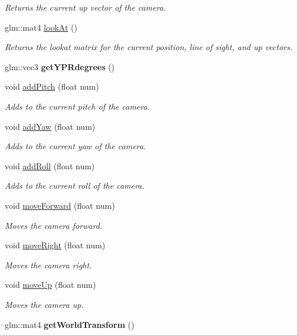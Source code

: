 \begin{DoxyCompactItemize}
\begin{DoxyCompactList}\small\item\em Returns the current up vector of the camera. \end{DoxyCompactList}\item 
glm\+::mat4 \hyperlink{class_y_p_r_camera_a6312430157dfe879afee0af5f7759a87}{look\+At} ()
\begin{DoxyCompactList}\small\item\em Returns the lookat matrix for the current position, line of sight, and up vectors. \end{DoxyCompactList}\item 
\mbox{\label{class_y_p_r_camera_aaac413817adc88cfc38a176bdc091abe}} 
glm\+::vec3 {\bfseries get\+Y\+P\+Rdegrees} ()
\item 
void \hyperlink{class_y_p_r_camera_ac301ce5ca1503a73cce5aa7a700c62e2}{add\+Pitch} (float num)
\begin{DoxyCompactList}\small\item\em Adds to the current pitch of the camera. \end{DoxyCompactList}\item 
void \hyperlink{class_y_p_r_camera_abca416bb77e38db7526e54e139153554}{add\+Yaw} (float num)
\begin{DoxyCompactList}\small\item\em Adds to the current yaw of the camera. \end{DoxyCompactList}\item 
void \hyperlink{class_y_p_r_camera_a40cd825b06e9d3b361bd3cf7c05d7b2a}{add\+Roll} (float num)
\begin{DoxyCompactList}\small\item\em Adds to the current roll of the camera. \end{DoxyCompactList}\item 
void \hyperlink{class_y_p_r_camera_a3fa6a8dba8cea84cabb9155b030d849e}{move\+Forward} (float num)
\begin{DoxyCompactList}\small\item\em Moves the camera forward. \end{DoxyCompactList}\item 
void \hyperlink{class_y_p_r_camera_a477ddad236b2b2d6cb2c8a7ae60cfa53}{move\+Right} (float num)
\begin{DoxyCompactList}\small\item\em Moves the camera right. \end{DoxyCompactList}\item 
void \hyperlink{class_y_p_r_camera_a37f3668e2f09ec2f7004d016844b468e}{move\+Up} (float num)
\begin{DoxyCompactList}\small\item\em Moves the camera up. \end{DoxyCompactList}\item 
\mbox{\label{class_y_p_r_camera_ad1e226c1ccc043b6981831311f1f8d7a}} 
glm\+::mat4 {\bfseries get\+World\+Transform} ()
\end{DoxyCompactItemize}


